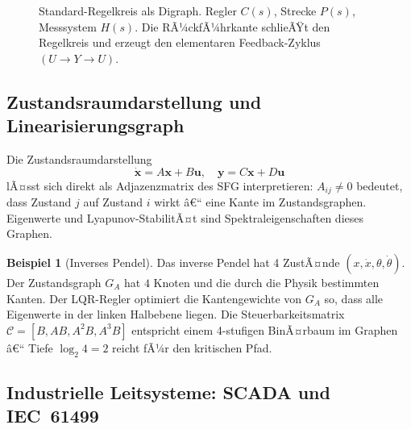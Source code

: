 ﻿\documentclass[12pt,a4paper,twoside]{article}
\theoremstyle{definition}
\newtheorem{beispiel}{Beispiel}[section]
\theoremstyle{plain}
\theoremstyle{remark}
\begin{document}
\begin{figure}[h]
  \centering
  \caption{Standard-Regelkreis als Digraph.  Regler $C(s)$,
           Strecke $P(s)$, Messsystem $H(s)$.  Die RÃ¼ckfÃ¼hrkante
           schlieÃŸt den Regelkreis und erzeugt den elementaren
           Feedback-Zyklus $(U \to Y \to U)$.}
  \label{fig:regelkreis}
\end{figure}

\subsection{Zustandsraumdarstellung und Linearisierungsgraph}

Die Zustandsraumdarstellung
\[
  \dot{\mathbf{x}} = A\mathbf{x} + B\mathbf{u}, \quad
  \mathbf{y} = C\mathbf{x} + D\mathbf{u}
\]
lÃ¤sst sich direkt als Adjazenzmatrix des SFG interpretieren:
$A_{ij} \neq 0$ bedeutet, dass Zustand $j$ auf Zustand $i$ wirkt â€“
eine Kante im Zustandsgraphen.  Eigenwerte und Lyapunov-StabilitÃ¤t
sind Spektraleigenschaften dieses Graphen.

\begin{beispiel}[Inverses Pendel]
Das inverse Pendel hat 4 ZustÃ¤nde $(x, \dot{x}, \theta, \dot{\theta})$.
Der Zustandsgraph $G_A$ hat $4$ Knoten und die durch die
Physik bestimmten Kanten.  Der LQR-Regler optimiert die
Kantengewichte von $G_A$ so, dass alle Eigenwerte in der
linken Halbebene liegen.  Die Steuerbarkeitsmatrix
$\mathcal{C} = [B, AB, A^2B, A^3B]$ entspricht einem
4-stufigen BinÃ¤rbaum im Graphen â€“ Tiefe $\log_2 4 = 2$ reicht
fÃ¼r den kritischen Pfad.
\end{beispiel}

\subsection{Industrielle Leitsysteme: SCADA und IEC~61499}
\end{document}
